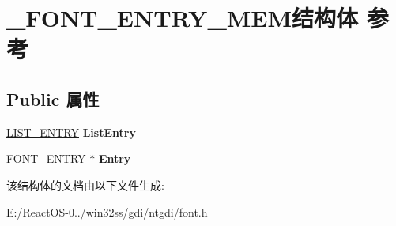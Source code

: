 \hypertarget{struct___f_o_n_t___e_n_t_r_y___m_e_m}{}\section{\+\_\+\+F\+O\+N\+T\+\_\+\+E\+N\+T\+R\+Y\+\_\+\+M\+E\+M结构体 参考}
\label{struct___f_o_n_t___e_n_t_r_y___m_e_m}
\subsection*{Public 属性}
\begin{DoxyCompactItemize}
\item 
\mbox{\label{struct___f_o_n_t___e_n_t_r_y___m_e_m_a412c84a147702e3a11e449582f07cca2}} 
\hyperlink{struct___l_i_s_t___e_n_t_r_y}{L\+I\+S\+T\+\_\+\+E\+N\+T\+RY} {\bfseries List\+Entry}
\item 
\mbox{\label{struct___f_o_n_t___e_n_t_r_y___m_e_m_a762afb7ce7e125d6c2ec31868e898150}} 
\hyperlink{struct___f_o_n_t___e_n_t_r_y}{F\+O\+N\+T\+\_\+\+E\+N\+T\+RY} $\ast$ {\bfseries Entry}
\end{DoxyCompactItemize}


该结构体的文档由以下文件生成\+:\begin{DoxyCompactItemize}
\item 
E\+:/\+React\+O\+S-\/0../win32ss/gdi/ntgdi/font.\+h\end{DoxyCompactItemize}
